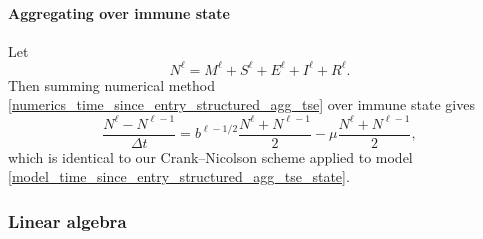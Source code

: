 \documentclass{jpmarticle}
\begin{document}
\paragraph{Aggregating over immune state}

Let
\begin{equation}
  N^{\ell}
  = M^{\ell} + S^{\ell} + E^{\ell} + I^{\ell} + R^{\ell}.
\end{equation}
Then summing numerical method
\eqref{numerics_time_since_entry_structured_agg_tse} over immune state
gives
\begin{equation}
  \label{numerics_time_since_entry_structured_agg_tse_state}
  \frac{N^{\ell} - N^{\ell - 1}}{\Delta t}
  = b^{\ell - 1 / 2} \frac{N^{\ell} + N^{\ell - 1}}{2}
  - \mu \frac{N^{\ell} + N^{\ell - 1}}{2},
\end{equation}
which is identical to our Crank--Nicolson scheme applied to model
\eqref{model_time_since_entry_structured_agg_tse_state}.


\subsubsection{Linear algebra}
\end{document}
